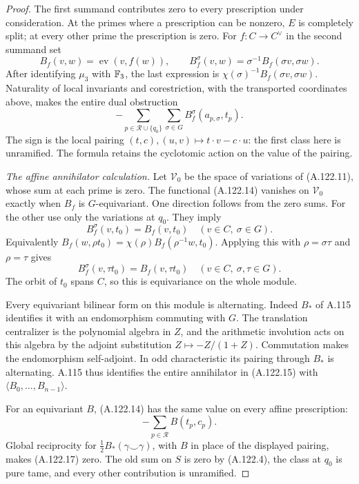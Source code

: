 \begin{proof}
The first summand contributes zero to every
prescription under consideration.
At the primes where a prescription can be nonzero,
\(E\) is completely split; at every other prime
the prescription is zero.
For \(f:C\to C^\vee\) in the second summand set
\[
 B_f(v,w)=\operatorname{ev}(v,f(w)),\qquad
 B_f^\sigma(v,w)=\sigma^{-1}B_f(\sigma v,\sigma w).
 \tag{A.122.13}
\]
After identifying \(\mu_3\) with \(\mathbb F_3\), the
last expression is
\(\chi(\sigma)^{-1}B_f(\sigma v,\sigma w)\).
Naturality of local invariants and corestriction,
with the transported coordinates above, makes
the entire dual obstruction
\[
       -\sum_{p\in\mathcal R\cup\{q_0\}}
                     \sum_{\sigma\in G}
                           B_f^\sigma(a_{p,\sigma},t_p).
 \tag{A.122.14}
\]
The sign is the local pairing
\((t,c),(u,v)\mapsto t\cdot v-c\cdot u\):
the first class here is unramified.
The formula retains the cyclotomic action on
the value of the pairing.

\emph{The affine annihilator calculation.}
Let \(\mathcal V_0\) be the space of variations
of (A.122.11), whose sum at each prime is zero.
The functional (A.122.14) vanishes on
\(\mathcal V_0\) exactly when \(B_f\) is
\(G\)-equivariant.
One direction follows from the zero sums.
For the other use only the variations at \(q_0\).
They imply
\[
 B_f^\sigma(v,t_0)=B_f(v,t_0)
                      \quad(v\in C,\ \sigma\in G).
 \tag{A.122.15}
\]
Equivalently
\(B_f(w,\rho t_0)=\chi(\rho)B_f(\rho^{-1}w,t_0)\).
Applying this with \(\rho=\sigma\tau\) and
\(\rho=\tau\) gives
\[
 B_f^\sigma(v,\tau t_0)=B_f(v,\tau t_0)
                         \quad(v\in C,\ \sigma,\tau\in G).
 \tag{A.122.16}
\]
The orbit of \(t_0\) spans \(C\), so this is
equivariance on the whole module.

Every equivariant bilinear form on this module
is alternating.  Indeed \(B_*\) of A.115
identifies it with an endomorphism commuting
with \(G\).  The translation centralizer is
the polynomial algebra in \(Z\), and the
arithmetic involution acts on this algebra
by the adjoint substitution
\(Z\mapsto-Z/(1+Z)\).
Commutation makes the endomorphism self-adjoint.
In odd characteristic its pairing through
\(B_*\) is alternating.
A.115 thus identifies the entire annihilator
in (A.122.15) with
\(\langle B_0,\ldots,B_{n-1}\rangle\).

For an equivariant \(B\), (A.122.14) has the
same value on every affine prescription:
\[
                -\sum_{p\in\mathcal R}B(t_p,c_p).
 \tag{A.122.17}
\]
Global reciprocity for
\(\tfrac12 B_*(\gamma\smile\gamma)\), with \(B\)
in place of the displayed pairing, makes
(A.122.17) zero.
The old sum on \(S\) is zero by (A.122.4),
the class at \(q_0\) is pure tame, and every
other contribution is unramified.


\end{proof}
